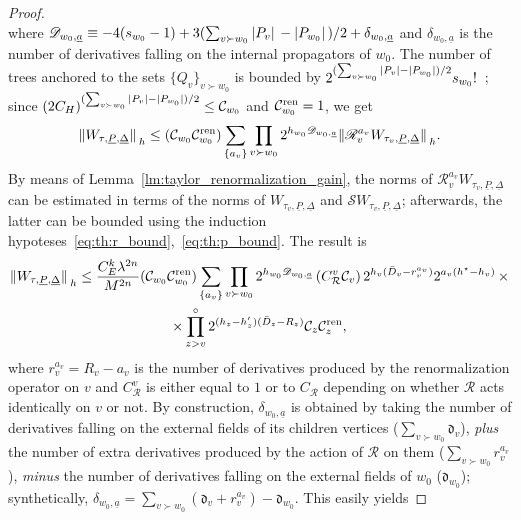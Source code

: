 \documentclass[a4paper, 11pt]{article}
\newcommand{\ren}{\mathcal{R}}								%
\newcommand{\kren}{\mathscr{R}}								%
\theoremstyle{thm}
\begin{document}
\begin{proof}
\begin{equation}
\end{equation}
where $\mathscr{D}_{w_0, \underline{a}} \equiv -4(s_{w_0} - 1) + 3(\sum_{v \succ w_0} \abs*{P_v} - \abs*{P_{w_0}})/2 + \delta_{w_0, \underline{a}}$ and $\delta_{w_0,\underline{a}}$ is the number of derivatives falling on the internal propagators of $w_0$. The number of trees anchored to the sets $\lbrace Q_v \rbrace_{v \succ w_0}$ is bounded by $2^{(\sum_{v \succ w_0} \abs*{P_v} - \abs*{P_{w_0}})/2} s_{w_0}!$~\cite[Lemma 2.4]{Mastropietro_Nonpert_Renorm}; since $(2C_H)^{(\sum_{v \succ w_0} \abs*{P_v} - \abs*{P_{w_0}})/2} \le \mathcal{C}_{w_0}$ and $\mathcal{C}^{\textup{ren}}_{w_0} = 1$, we get
\begin{equation}
\label{eq:th:bound_after_BBF_refined}
\norm*{W_{\tau, \underline{P}, \underline{\Delta}}}_h \le (\mathcal{C}_{w_0} \mathcal{C}^{\textup{ren}}_{w_0}) \sum_{\lbrace a_v \rbrace} \prod_{v \succ w_0} 2^{h_{w_0}\mathscr{D}_{w_0, \underline{a}}} \norm*{\kren_v^{a_v} W_{\tau_v, \underline{P}, \underline{\Delta}}}_h.
\end{equation}
By means of Lemma~\ref{lm:taylor_renormalization_gain}, the norms of $\kren_v^{a_v} W_{\tau_v, \underline{P}, \underline{\Delta}}$ can be estimated in terms of the norms of $W_{\tau_v, \underline{P}, \underline{\Delta}}$ and $\mathscr{S} W_{\tau_v, \underline{P}, \underline{\Delta}}$; afterwards, the latter can be bounded using the induction hypoteses~\eqref{eq:th:r_bound},~\eqref{eq:th:p_bound}. The result is
\begin{multline}
\label{eq:th:bound_after_BBF_quasi_final}
\norm*{W_{\tau, \underline{P}, \underline{\Delta}}}_h \le \frac{C^k_E \lambda^{2n}}{M^{2n}} (\mathcal{C}_{w_0} \mathcal{C}_{w_0}^{\textup{ren}}) \sum_{\lbrace a_v \rbrace} \prod_{v \succ w_0} 2^{h_{w_0}\mathscr{D}_{w_0, \underline{a}}} \, (C_\ren^v \mathcal{C}_v) \, 2^{h_v (\bar{D}_v - r^{a_v}_v)} 2^{a_v(h^\star - h_v)} \, \times \\
\times \prod_{z > v}^\circ 2^{(h_z - h'_z)(\bar{D}_z - R_z)} \mathcal{C}_z \mathcal{C}^{\textup{ren}}_z,
\end{multline}
where $r_v^{a_v} = R_v - a_v$ is the number of derivatives produced by the renormalization operator on $v$ and $C_\ren^v$ is either equal to $1$ or to $C_\ren$ depending on whether $\ren$ acts identically on $v$ or not. By construction, $\delta_{w_0, \underline{a}}$ is obtained by taking the number of derivatives falling on the external fields of its children vertices ($\sum_{v \succ w_0} \mathfrak{d}_v$), \emph{plus} the number of extra derivatives produced by the action of $\ren$ on them ($\sum_{v \succ w_0} r^{a_v}_v$), \emph{minus} the number of derivatives falling on the external fields of $w_0$ ($\mathfrak{d}_{w_0}$); synthetically, $\delta_{w_0, \underline{a}} = \sum_{v \succ w_0} (\mathfrak{d}_v + r^{a_v}_v) - \mathfrak{d}_{w_0}$. This easily yields

\end{proof}
\end{document}
